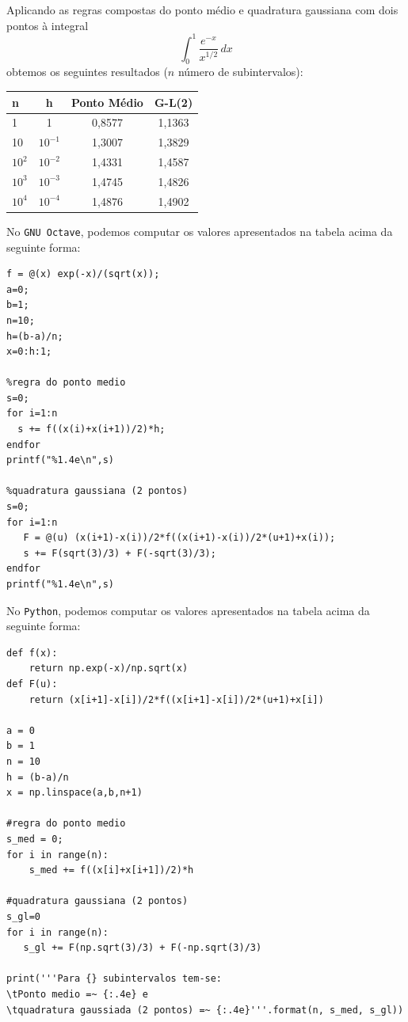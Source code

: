 \begin{ex}\label{ex:int_impropria1}
  Aplicando as regras compostas do ponto médio e quadratura gaussiana com dois pontos à integral
  \begin{equation}
    \int_0^1 \frac{e^{-x}}{x^{1/2}}\,dx
  \end{equation}
obtemos os seguintes resultados ($n$ número de subintervalos):
\begin{center}
  \begin{tabular}{lc|c|c}\hline
    n      & h        & Ponto Médio & G-L(2)\\\hline
    1      & 1        & 0,8577 & 1,1363\\
    10     & $10^{-1}$ & 1,3007 & 1,3829\\
    $10^2$ & $10^{-2}$ & 1,4331 & 1,4587\\
    $10^3$ & $10^{-3}$ & 1,4745 & 1,4826\\
    $10^4$ & $10^{-4}$ & 1,4876 & 1,4902\\\hline
  \end{tabular}
\end{center}

\ifisscilab
\construirScilab
\fi
\ifisoctave
No \verb+GNU Octave+, podemos computar os valores apresentados na tabela acima da seguinte forma:
\begin{verbatim}
f = @(x) exp(-x)/(sqrt(x));
a=0;
b=1;
n=10;
h=(b-a)/n;
x=0:h:1;

%regra do ponto medio
s=0;
for i=1:n
  s += f((x(i)+x(i+1))/2)*h;
endfor
printf("%1.4e\n",s)

%quadratura gaussiana (2 pontos)
s=0;
for i=1:n
   F = @(u) (x(i+1)-x(i))/2*f((x(i+1)-x(i))/2*(u+1)+x(i));
   s += F(sqrt(3)/3) + F(-sqrt(3)/3);
endfor
printf("%1.4e\n",s)
\end{verbatim}
\fi
\ifispython
No \verb+Python+, podemos computar os valores apresentados na tabela acima da seguinte forma:
\begin{verbatim}
def f(x):
    return np.exp(-x)/np.sqrt(x)
def F(u):
    return (x[i+1]-x[i])/2*f((x[i+1]-x[i])/2*(u+1)+x[i])

a = 0
b = 1
n = 10
h = (b-a)/n
x = np.linspace(a,b,n+1)

#regra do ponto medio
s_med = 0;
for i in range(n):
    s_med += f((x[i]+x[i+1])/2)*h

#quadratura gaussiana (2 pontos)
s_gl=0
for i in range(n):
   s_gl += F(np.sqrt(3)/3) + F(-np.sqrt(3)/3)

print('''Para {} subintervalos tem-se:
\tPonto medio =~ {:.4e} e
\tquadratura gaussiada (2 pontos) =~ {:.4e}'''.format(n, s_med, s_gl))
\end{verbatim}
\fi
\end{ex}

